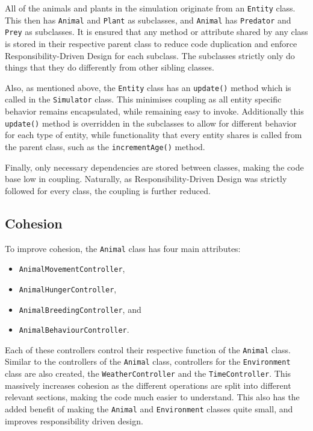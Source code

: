 \documentclass[10pt, a4paper]{scrartcl}
\begin{document}
\begin{multicols}{2}
        \noindent All of the animals and plants in the simulation originate from an \verb|Entity| class. This then has
        \verb|Animal| and \verb|Plant| as subclasses, and \verb|Animal| has \verb|Predator| and \verb|Prey| as subclasses.
        It is ensured that any method or attribute shared by any class is stored in their respective parent class to reduce
        code duplication and enforce Responsibility-Driven Design for each subclass. The subclasses strictly only do things
        that they do differently from other sibling classes.

        \noindent Also, as mentioned above, the \verb|Entity| class has an \verb|update()| method which is called in the
        \verb|Simulator| class. This minimises coupling as all entity specific behavior remains encapsulated, while remaining
        easy to invoke. Additionally this \verb|update()| method is overridden in the subclasses to allow for different
        behavior for each type of entity, while functionality that every entity shares is called from the parent class, such as
        the \verb|incrementAge()| method.

        \noindent Finally, only necessary dependencies are stored between classes, making the code base low in coupling.
        Naturally, as Responsibility-Driven Design was strictly followed for every class, the coupling is further reduced.

        \subsection{Cohesion}
        \noindent To improve cohesion, the \verb|Animal| class has four main attributes:
        \begin{itemize}
            \setlength\itemsep{-0.25em}
            \item \verb|AnimalMovementController|,
            \item \verb|AnimalHungerController|,
            \item \verb|AnimalBreedingController|, and
            \item \verb|AnimalBehaviourController|.
        \end{itemize}
        Each of these controllers
        control their respective function of the \verb|Animal| class. Similar to the controllers of the \verb|Animal| class, controllers
        for the \verb|Environment| class are also created, the \verb|WeatherController| and the \verb|TimeController|.
        This massively increases cohesion as the different operations
        are split into different relevant sections, making the code much easier to understand. This also has the added benefit of making
        the \verb|Animal| and \verb|Environment| classes quite small, and improves responsibility driven design.


\end{multicols}
\end{document}
